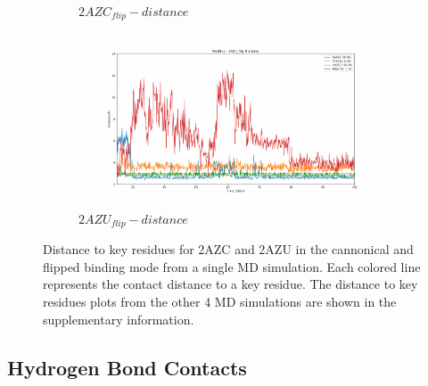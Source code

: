 \begin{figure}[!ht]
\begin{subfigure}{.45\textwidth}
     \caption{$2AZC_{flip}-distance$}
     \label{fig:2AZC_flip-dist}
   \end{subfigure}
    \begin{subfigure}{.45\textwidth}
     \centering
     \includegraphics[width=.95\linewidth]{chapter4/2AZU_flip/2AZU_flip-dist_4.pdf}
     \caption{$2AZU_{flip}-distance$}
     \label{fig:2AZU_flip-dist}
   \end{subfigure}
\caption{Distance to key residues for 2AZC and 2AZU in the cannonical and flipped binding mode from a single MD simulation. Each colored line represents the contact distance to a key residue. The distance to key residues plots from the other 4 MD simulations are shown in the supplementary information. }
\label{fig:contact-distance}
\end{figure}  

\subsection{Hydrogen Bond Contacts}

